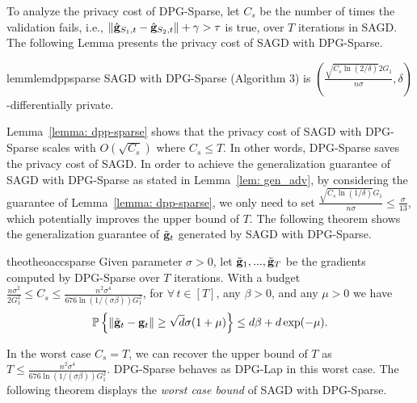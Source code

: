 \documentclass[11pt]{article}
\begin{document}
To analyze the privacy cost of DPG-Sparse, let $C_{s}$ be the number of times the validation fails, i.e., $\| \hat {\mathbf{g}}_{S_1,t} - \hat {\mathbf{g}}_{S_2,t}\| + \gamma >  \tau$ is true, over $T$ iterations in \textsc{SAGD}. The following Lemma presents the privacy cost of \textsc{SAGD} with DPG-Sparse.

\begin{restatable}{lemm}{lemdppsparse}
\label{lemma: dpp-sparse}
\textsc{SAGD} with DPG-Sparse  (Algorithm 3) is  
$(\frac{\sqrt{C_{s} \ln(2/\delta)} 2G_1}{n\sigma}, \delta)$-differentially private. 
\end{restatable}




Lemma~\ref{lemma: dpp-sparse} shows that the privacy cost of  \textsc{SAGD} with DPG-Sparse scales with $O(\sqrt{C_{s}})$ where $C_{s} \leq T$. In other words, DPG-Sparse saves the privacy cost of \textsc{SAGD}. In order to achieve the generalization guarantee of \textsc{SAGD} with DPG-Sparse as stated in Lemma~\ref{lem: gen_adv},  by considering the guarantee of Lemma~\ref{lemma: dpp-sparse},  we only need to set $\frac{\sqrt{C_{s} \ln(1/\delta)} G_1}{n\sigma} \leq \frac{\sigma}{13}$, which potentially improves the upper bound of $T$. 
The following theorem shows the generalization guarantee of $\tilde {\mathbf{g}}_t$ generated by \textsc{SAGD} with DPG-Sparse.

\begin{restatable}{theo}{theoaccsparse}
\label{thm: acc_sparse}
Given parameter $\sigma > 0$, let $\tilde {\mathbf{g}}_1,...,  \tilde {\mathbf{g}}_T$ be the gradients computed by DPG-Sparse over $T$ iterations. With a budget $ \frac{n\sigma^2}{2G_1^2} \leq C_{s} \leq\frac{n^2 \sigma^4}{676 \ln(1/(\sigma \beta))G_1^2}$, for $\forall\, t \in [T]$, any $\beta > 0$, and any $\mu > 0$ we have 
        \begin{equation*}
    \mathbb{P}\left\{\|\tilde {\mathbf{g}}_t - \mathbf{g}_t\| \geq \sqrt{d}\sigma(1+\mu)\right\} \leq d\beta + d\exp(-\mu).
    \end{equation*}
\end{restatable}


In the worst case $C_{s} = T$, we can recover the upper bound of $T$ as $T \leq \frac{n^2 \sigma^4}{676 \ln(1/(\sigma \beta))G_1^2}$. DPG-Sparse behaves as DPG-Lap in this worst case.
The following theorem displays the \emph{worst case bound} of \textsc{SAGD} with DPG-Sparse.
    
\end{document}
